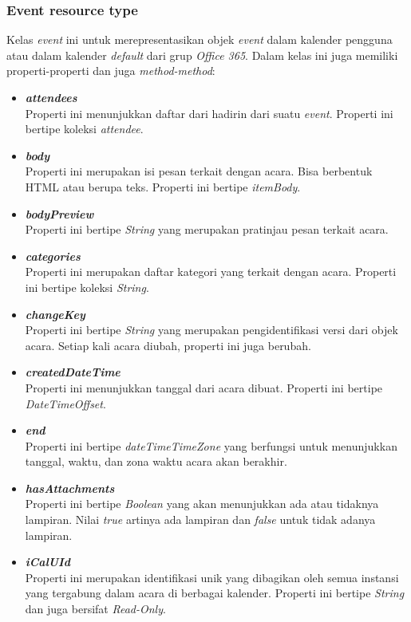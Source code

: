 \subsubsection{Event resource type}
Kelas \textit{event} ini untuk merepresentasikan objek \textit{event} dalam kalender pengguna atau dalam kalender \textit{default} dari grup \textit{Office 365}. Dalam kelas ini juga memiliki properti-properti dan juga \textit{method-method}:
\begin{itemize}
	\item \textbf{\textit{attendees}}\\
	Properti ini menunjukkan daftar dari hadirin dari suatu \textit{event}. Properti ini bertipe koleksi \textit{attendee}. 
	\item \textbf{\textit{body}}\\
	Properti ini merupakan isi pesan terkait dengan acara. Bisa berbentuk HTML atau berupa teks. Properti ini bertipe \textit{itemBody}. 
	\item \textbf{\textit{bodyPreview}}\\
	Properti ini bertipe \textit{String} yang merupakan pratinjau pesan terkait acara. 
	\item \textbf{\textit{categories}}\\
	Properti ini merupakan daftar kategori yang terkait dengan acara. Properti ini bertipe koleksi \textit{String}.
	\item \textbf{\textit{changeKey}}\\
	Properti ini bertipe \textit{String} yang merupakan pengidentifikasi versi dari objek acara. Setiap kali acara diubah, properti ini juga berubah. 
	\item \textbf{\textit{createdDateTime}}\\
	Properti ini menunjukkan tanggal dari acara dibuat. Properti ini bertipe \textit{DateTimeOffset}. 
	\item \textbf{\textit{end}}\\
	Properti ini bertipe \textit{dateTimeTimeZone} yang berfungsi untuk menunjukkan tanggal, waktu, dan zona waktu acara akan berakhir. 
	\item \textbf{\textit{hasAttachments}}\\
	Properti ini bertipe \textit{Boolean} yang akan menunjukkan ada atau tidaknya lampiran. Nilai \textit{true} artinya ada lampiran dan \textit{false} untuk tidak adanya lampiran. 
	\item \textbf{\textit{iCalUId}}\\
	Properti ini merupakan identifikasi unik yang dibagikan oleh semua instansi yang tergabung dalam acara di berbagai kalender. Properti ini bertipe \textit{String} dan juga bersifat \textit{Read-Only}. 

\end{itemize}
